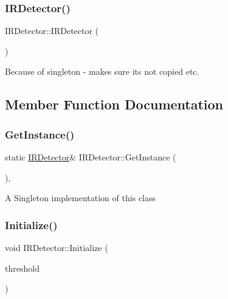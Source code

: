 \subsubsection{\texorpdfstring{I\+R\+Detector()}{IRDetector()}\hspace{0.1cm}{\footnotesize\ttfamily [2/2]}}
{\footnotesize\ttfamily I\+R\+Detector\+::\+I\+R\+Detector (\begin{DoxyParamCaption}\item[{const \hyperlink{class_i_r_detector}{I\+R\+Detector} \&}]{ }\end{DoxyParamCaption})\hspace{0.3cm}{\ttfamily [delete]}}

Because of singleton -\/ makes sure its not copied etc. 

\subsection{Member Function Documentation}
\hypertarget{class_i_r_detector_a33500cea89076a0199e750db2fc971b9}{}\label{class_i_r_detector_a33500cea89076a0199e750db2fc971b9} 
\subsubsection{\texorpdfstring{Get\+Instance()}{GetInstance()}}
{\footnotesize\ttfamily static \hyperlink{class_i_r_detector}{I\+R\+Detector}\& I\+R\+Detector\+::\+Get\+Instance (\begin{DoxyParamCaption}{ }\end{DoxyParamCaption})\hspace{0.3cm}{\ttfamily [inline]}, {\ttfamily [static]}}

A Singleton implementation of this class \hypertarget{class_i_r_detector_a67c4bdc24a3fedcdf32dc9186c53a902}{}\label{class_i_r_detector_a67c4bdc24a3fedcdf32dc9186c53a902} 
\subsubsection{\texorpdfstring{Initialize()}{Initialize()}}
{\footnotesize\ttfamily void I\+R\+Detector\+::\+Initialize (\begin{DoxyParamCaption}\item[{uint16\+\_\+t}]{threshold }\end{DoxyParamCaption})}


